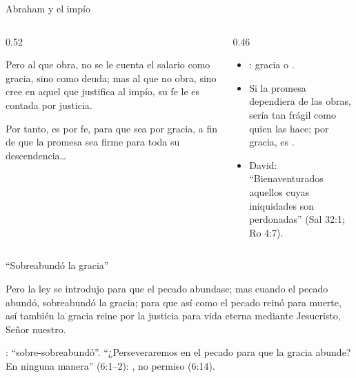 \begin{frame}{Abraham y el impío}
\begin{columns}[c,onlytextwidth]
\begin{column}{0.52\textwidth}
\begin{cita}Pero al que obra, no se le cuenta el salario como gracia, sino como deuda; mas al que no obra, sino cree en aquel que justifica al impío, su fe le es contada por justicia.\end{cita}
\begin{cita}Por tanto, es por fe, para que sea por gracia, a fin de que la promesa sea firme para toda su descendencia\ldots{}\end{cita}
\end{column}
\begin{column}{0.46\textwidth}\small\RaggedRight
\begin{itemize}
\item {}: gracia o .
\item Si la promesa dependiera de las obras, sería tan frágil como quien las hace; por gracia, es .
\item David: ``Bienaventurados aquellos cuyas iniquidades son perdonadas'' (Sal 32:1; Ro 4:7).
\end{itemize}
\end{column}
\end{columns}
\end{frame}

\begin{frame}{``Sobreabundó la gracia''}
\begin{cita}Pero la ley se introdujo para que el pecado abundase; mas cuando el pecado abundó, sobreabundó la gracia; para que así como el pecado reinó para muerte, así también la gracia reine por la justicia para vida eterna mediante Jesucristo, Señor nuestro.\end{cita}
\centering
{}\par\smallskip
\scriptsize {}: ``sobre-sobreabundó''. ``¿Perseveraremos en el pecado para que la gracia abunde? En ninguna manera'' (6:1--2): , no permiso (6:14).
\end{frame}

